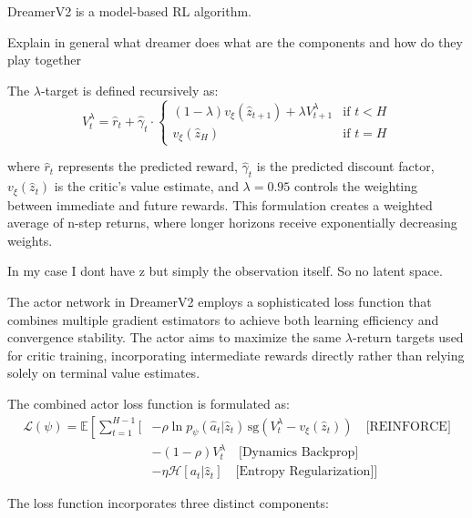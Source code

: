 \documentclass[
	english,
	ruledheaders=section,
	class=report,
	thesis={type=master},
	accentcolor=9c,
	custommargins=true,
	marginpar=false,
	parskip=half-,
	fontsize=11pt,
]{tudapub}
\begin{document}
DreamerV2 \cite{hafner2019dreamer} is a model-based RL algorithm.

Explain in general what dreamer does
what are the components and how do they play together

The $\lambda$-target is defined recursively as:
\begin{equation}
	V^{\lambda}_t = \hat{r}_t + \hat{\gamma}_t \cdot \begin{cases}
		(1 - \lambda)v_\xi(\hat{z}_{t+1}) + \lambda V^{\lambda}_{t+1} & \text{if } t < H \\
		v_\xi(\hat{z}_H)                                              & \text{if } t = H
	\end{cases}
\end{equation}

where $\hat{r}_t$ represents the predicted reward, $\hat{\gamma}_t$ is the predicted discount factor, $v_\xi(\hat{z}_t)$ is the critic's value estimate, and $\lambda = 0.95$ controls the weighting between immediate and future rewards. This formulation creates a weighted average of n-step returns, where longer horizons receive exponentially decreasing weights.

In my case I dont have z but simply the observation itself. So no latent space.

The actor network in DreamerV2 employs a sophisticated loss function that combines multiple gradient estimators to achieve both learning efficiency and convergence stability. The actor aims to maximize the same $\lambda$-return targets used for critic training, incorporating intermediate rewards directly rather than relying solely on terminal value estimates.

The combined actor loss function is formulated as:
\begin{align}
	\mathcal{L}(\psi) = \mathbb{E}\left[\sum_{t=1}^{H-1} \Big[\right. & -\rho \ln p_\psi(\hat{a}_t | \hat{z}_t) \, \text{sg}(V^{\lambda}_t - v_\xi(\hat{z}_t)) \quad \text{[REINFORCE]} \\
	                                                                  & -(1-\rho)V^{\lambda}_t \quad \text{[Dynamics Backprop]}                                                         \\
	                                                                  & -\eta \mathcal{H}[a_t|\hat{z}_t] \quad \text{[Entropy Regularization]} \Big]
\end{align}

The loss function incorporates three distinct components:
\end{document}
